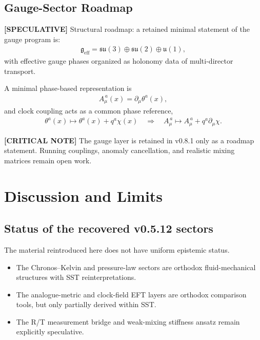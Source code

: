 \documentclass[11pt]{article}
\theoremstyle{definition}
\theoremstyle{plain}
\theoremstyle{remark}
\begin{document}
    \subsection{Gauge-Sector Roadmap}
        \label{subsec:integration_gauge}

        \textbf{[SPECULATIVE]} Structural roadmap: a retained minimal statement of the gauge program is:
        \begin{align}
            \mathfrak{g}_{\mathrm{eff}}
            =
            \mathfrak{su}(3)\oplus\mathfrak{su}(2)\oplus\mathfrak{u}(1),
        \end{align}
        with effective gauge phases organized as holonomy data of multi-director transport.

        A minimal phase-based representation is
        \begin{align}
            A_\mu^{\,a}(x) = \partial_\mu \theta^a(x),
            \label{eq:gauge_phase_potential}
        \end{align}
        and clock coupling acts as a common phase reference,
        \begin{align}
            \theta^a(x) \mapsto \theta^a(x) + q^a \chi(x)
            \quad\Rightarrow\quad
            A_\mu^{\,a} \mapsto A_\mu^{\,a} + q^a \partial_\mu \chi.
            \label{eq:gauge_clock_shift}
        \end{align}

        \textbf{[CRITICAL NOTE]} The gauge layer is retained in v0.8.1 only as a roadmap statement. Running couplings,
        anomaly cancellation, and realistic mixing matrices remain open work.

    \section{Discussion and Limits}
        \label{sec:discussion}

    \subsection{Status of the recovered v0.5.12 sectors}

        The material reintroduced here does not have uniform epistemic status.

        \begin{itemize}
            \item The Chronos--Kelvin and pressure-law sectors are orthodox fluid-mechanical structures with SST reinterpretations.
            \item The analogue-metric and clock-field EFT layers are orthodox comparison tools, but only partially derived within SST.
            \item The R/T measurement bridge and weak-mixing stiffness ansatz remain explicitly speculative.
        \end{itemize}
\end{document}
